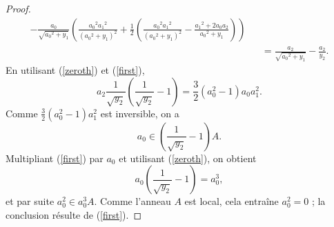 \documentclass[11pt]{amsart}
\begin{document}
\begin{proof}
\begin{eqnarray*}
 -\frac{{a_0}}{\sqrt   {{a_0}^2+{y_1}}}
   \left(\frac{{a_0}^2   {a_1}^2}{\left({a_0   }^2+{y_1}\right)^2}+\frac{1}{2}   \left(\frac{{a_0}^2
   {a_1}^2}{\left({a_0   }^2+{y_1}\right)^2}-\frac{{a_1}^2+2 {a_0}   {a_2}}{{a_0}^2+{y_1}}\right)\right) \\ & & = \frac{{a_2}}{\sqrt{{  a_0}^2+{y_1}}}-\frac{{a_2}}{{y_2}}.
\end{eqnarray*}
En utilisant (\ref{zeroth}) et (\ref{first}),  
\begin{equation} \label{second}
a_2 \frac{1}{\sqrt{y_2}} \left( \frac{1}{\sqrt{y_2}} -1 \right) = \frac32 (a_0^2-1) a_0 a_1^2.
\end{equation}
Comme $\frac 32 (a_0^2-1)a_1^2$ est inversible, on a $$a_0 \in \left( \frac{1}{\sqrt{y_2}} -1 \right) A.$$ Multipliant (\ref{first}) par $a_0$ et utilisant (\ref{zeroth}), on obtient $$a_0 \left( \frac{1}{\sqrt{y_2}} -1 \right) = a_0^3,$$ et par suite $a_0^2 \in a_0^3 A$. Comme l'anneau $A$ est local, cela entra\^ine $a_0^2=0$ ; la conclusion r\'esulte de (\ref{first}). 
\end{proof}
\end{document}
